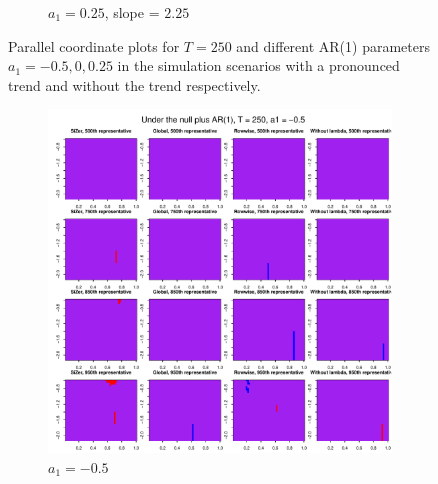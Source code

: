 \documentclass[a4paper,12pt]{article}
\begin{document}
\begin{figure}[t!]
\begin{subfigure}[b]{0.475\textwidth}
\caption{$a_1 = 0.25$, slope = $2.25$}
\end{subfigure}
\caption{Parallel coordinate plots for $T = 250$ and different AR(1) parameters $a_1 = -0.5, 0, 0.25$ in the simulation scenarios with a pronounced trend and without the trend respectively.}\label{fig:PCP}
\end{figure}

\begin{figure}[t!]
\begin{subfigure}[b]{0.475\textwidth}
\includegraphics[width=\textwidth]{Plots/representatives_T_250_a1_-50_slope_0.pdf}
\caption{$a_1 = -0.5$}
\end{subfigure}\hspace{0.25cm}
\begin{subfigure}[b]{0.475\textwidth}

\end{subfigure}
\end{figure}
\end{document}
